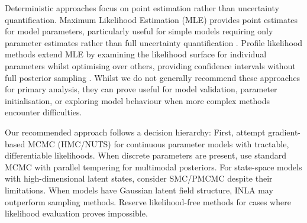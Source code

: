 \documentclass{article}
\begin{document}
Deterministic approaches focus on point estimation rather than uncertainty quantification.
Maximum Likelihood Estimation (MLE) provides point estimates for model parameters, particularly useful for simple models requiring only parameter estimates rather than full uncertainty quantification \citep{myung2003tutorial, baltazar2024maximum}.
Profile likelihood methods extend MLE by examining the likelihood surface for individual parameters whilst optimising over others, providing confidence intervals without full posterior sampling \citep{tonsing2018profile, plank2024structured}.
Whilst we do not generally recommend these approaches for primary analysis, they can prove useful for model validation, parameter initialisation, or exploring model behaviour when more complex methods encounter difficulties.

Our recommended approach follows a decision hierarchy:
First, attempt gradient-based MCMC (HMC/NUTS) for continuous parameter models with tractable, differentiable likelihoods.
When discrete parameters are present, use standard MCMC with parallel tempering for multimodal posteriors.
For state-space models with high-dimensional latent states, consider SMC/PMCMC despite their limitations.
When models have Gaussian latent field structure, INLA may outperform sampling methods.
Reserve likelihood-free methods for cases where likelihood evaluation proves impossible.
\end{document}
